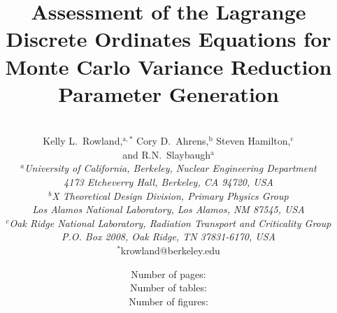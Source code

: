 \documentclass{article} %
\begin{document}

\title{Assessment of the Lagrange Discrete Ordinates Equations for Monte Carlo Variance
Reduction Parameter Generation} %

\author{
\vspace{20mm}
\\Kelly L.\ Rowland,$^{\text{a},\ast}$ Cory D.\ Ahrens,$^\text{b}$ Steven Hamilton,$^\text{c}$ 
\\and R.N.\ Slaybaugh$^{\text{a}}$\\[4pt] 
\textit{$^a$University of California, Berkeley, Nuclear Engineering Department}\\[-10pt]
\textit{4173 Etcheverry Hall, Berkeley, CA 94720, USA} \\[-5pt]
\textit{$^b$X Theoretical Design Division, Primary Physics Group}\\[-10pt]
\textit{Los Alamos National Laboratory, Los Alamos, NM 87545, USA}\\[-5pt]
\textit{$^c$Oak Ridge National Laboratory, Radiation Transport and Criticality Group} \\ [-10pt]
\textit{P.O. Box 2008, Oak Ridge, TN 37831-6170, USA} \\ [-2pt]
{$^\ast$krowland@berkeley.edu}}       %

\date{
\vspace{40mm}
Number of pages: \pageref{LastPage} \\
Number of tables: \totaltables \\
Number of figures: \totalfigures \\}

\maketitle

\pagebreak
\end{document}
